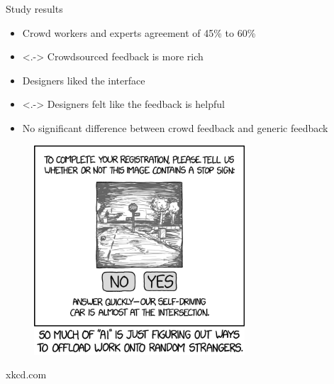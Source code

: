 
	\begin{frame}{Study results}
		\begin{itemize}
			\item<+-> Crowd workers and experts agreement of 45\% to 60\%
			\item<.-> Crowdsourced feedback is more rich
			\item<+-> Designers liked the interface
			\item<.-> Designers felt like the feedback is helpful
			\item<+-> No significant difference between crowd feedback and generic feedback
		\end{itemize}
	\end{frame}


	\begin{frame}[standout]
		\begin{figure}
			\centering
			\includegraphics[width=0.7\textwidth]{images/self_driving}
			\label{fig:bad_note}
		\end{figure}
		xkcd.com
	\end{frame}

% 
% 


